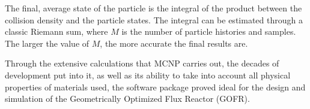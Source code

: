 The final, average state of the particle is the integral of the product between the collision density and the particle states. The integral can be estimated through a classic Riemann sum, where $M$ is the number of particle histories and samples. The larger the value of $M$, the more accurate the final results are. 

Through the extensive calculations that MCNP carries out, the decades of development put into it, as well as its ability to take into account all physical properties of materials used, the software package proved ideal for the design and simulation of the Geometrically Optimized Flux Reactor (GOFR).
